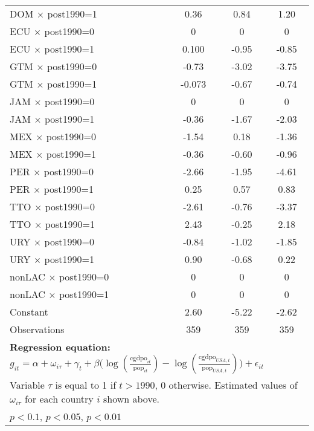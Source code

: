 \begin{sidewaystable}[htbp]
\begin{tabular}{l*{3}{c}}
DOM $\times$ post1990=1&     0.36\sym{***}&     0.84\sym{***}&     1.20\sym{***}\\
ECU $\times$ post1990=0&        0         &        0         &        0         \\
ECU $\times$ post1990=1&    0.100         &    -0.95\sym{***}&    -0.85\sym{**} \\
GTM $\times$ post1990=0&    -0.73\sym{***}&    -3.02\sym{***}&    -3.75\sym{***}\\
GTM $\times$ post1990=1&   -0.073         &    -0.67\sym{**} &    -0.74\sym{**} \\
JAM $\times$ post1990=0&        0         &        0         &        0         \\
JAM $\times$ post1990=1&    -0.36\sym{**} &    -1.67\sym{***}&    -2.03\sym{***}\\
MEX $\times$ post1990=0&    -1.54\sym{***}&     0.18         &    -1.36\sym{**} \\
MEX $\times$ post1990=1&    -0.36\sym{**} &    -0.60\sym{**} &    -0.96\sym{**} \\
PER $\times$ post1990=0&    -2.66\sym{***}&    -1.95\sym{***}&    -4.61\sym{***}\\
PER $\times$ post1990=1&     0.25         &     0.57\sym{*}  &     0.83\sym{*}  \\
TTO $\times$ post1990=0&    -2.61\sym{***}&    -0.76         &    -3.37\sym{***}\\
TTO $\times$ post1990=1&     2.43\sym{***}&    -0.25         &     2.18\sym{***}\\
URY $\times$ post1990=0&    -0.84\sym{***}&    -1.02\sym{***}&    -1.85\sym{***}\\
URY $\times$ post1990=1&     0.90\sym{***}&    -0.68\sym{***}&     0.22         \\
nonLAC $\times$ post1990=0&        0         &        0         &        0         \\
nonLAC $\times$ post1990=1&        0         &        0         &        0         \\
Constant        &     2.60\sym{**} &    -5.22\sym{***}&    -2.62         \\
\midrule
Observations    &      359         &      359         &      359         \\
\bottomrule
\multicolumn{4}{l}{\footnotesize \textbf{Regression equation:} \(g_{it} = \alpha + \omega_{i\tau} + \gamma_t + \beta \big(\log (\frac{\textrm{cgdpo}_{it}}{\textrm{pop}_{it}} ) - \log (\frac{\textrm{cgdpo}_{USA,t}}{\textrm{pop}_{USA,t}}  ) \big) + \epsilon_{it}\)}\\
\multicolumn{4}{l}{\footnotesize Variable \(\tau\) is equal to 1 if \(t > 1990\), 0 otherwise. Estimated values of \(\omega_{i\tau}\) for each country \(i\) shown above.}\\
\multicolumn{4}{l}{\footnotesize \sym{*} \(p<0.1\), \sym{**} \(p<0.05\), \sym{***} \(p<0.01\)}\\
\end{tabular}
\end{sidewaystable}

